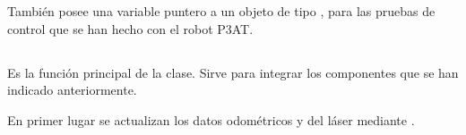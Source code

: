 \noindent
También posee una variable puntero a un objeto de tipo , para las pruebas de control que se han hecho con el robot P3AT.


%
%
%
%
%
%
%
%
%
%

\subsection{}

\noindent
{}

\noindent
Es la función principal de la clase. Sirve para integrar los componentes que se han indicado anteriormente.

\noindent
En primer lugar se actualizan los datos odométricos y del láser mediante .

